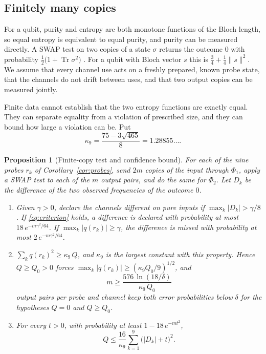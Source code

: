 \documentclass[12pt,a4paper]{article}
\newtheorem{proposition}[theorem]{Proposition}
\begin{document}
\subsection{Finitely many copies}

For a qubit, purity and entropy are both monotone functions of the Bloch length, so equal entropy is equivalent to equal purity, and purity can be measured directly. A SWAP test on two copies of a state $\sigma$ returns the outcome $0$ with probability $\tfrac12\bigl(1+\operatorname{Tr}\sigma^2\bigr)$ \cite{Buhrman2001}. For a qubit with Bloch vector $s$ this is $\tfrac34+\tfrac14\|s\|^2$. We assume that every channel use acts on a freshly prepared, known probe state, that the channels do not drift between uses, and that two output copies can be measured jointly.

Finite data cannot establish that the two entropy functions are exactly equal. They can separate equality from a violation of prescribed size, and they can bound how large a violation can be. Put
\[
\kappa_9=\frac{75-3\sqrt{465}}{8}=1.28855\ldots .
\]

\begin{proposition}[Finite-copy test and confidence bound]
\label{prop:finite}
For each of the nine probes $r_k$ of Corollary~\ref{cor:probes}, send $2m$ copies of the input through $\Phi_1$, apply a SWAP test to each of the $m$ output pairs, and do the same for $\Phi_2$. Let $D_k$ be the difference of the two observed frequencies of the outcome $0$.
\begin{enumerate}
\item Given $\gamma>0$, declare the channels different on pure inputs if $\max_k|D_k|>\gamma/8$. If \eqref{eq:criterion} holds, a difference is declared with probability at most $18\,e^{-m\gamma^2/64}$. If $\max_k|q(r_k)|\ge\gamma$, the difference is missed with probability at most $2\,e^{-m\gamma^2/64}$.
\item $\sum_kq(r_k)^2\ge\kappa_9\,Q$, and $\kappa_9$ is the largest constant with this property. Hence $Q\ge Q_0>0$ forces $\max_k|q(r_k)|\ge(\kappa_9Q_0/9)^{1/2}$, and
\[
m\ge\frac{576\,\ln(18/\delta)}{\kappa_9\,Q_0}
\]
output pairs per probe and channel keep both error probabilities below $\delta$ for the hypotheses $Q=0$ and $Q\ge Q_0$.
\item For every $t>0$, with probability at least $1-18\,e^{-mt^2}$,
\[
Q\le\frac{16}{\kappa_9}\sum_{k=1}^9\bigl(|D_k|+t\bigr)^2 .
\]
\end{enumerate}
\end{proposition}
\end{document}
